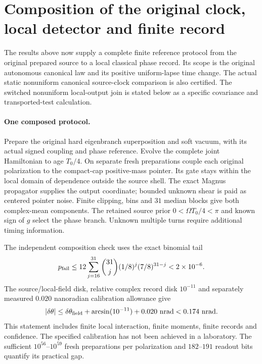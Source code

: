 \section{Composition of the original clock, local detector and finite record}
\label{sec:composition6-join}

The results above now supply a complete finite reference protocol from the
original prepared source to a local classical phase record. Its scope is
the original autonomous canonical law and its positive uniform-lapse time
change. The actual static nonuniform canonical source-clock comparison is
also certified. The switched nonuniform local-output join is stated below
as a specific covariance and transported-test calculation.

\paragraph{One composed protocol.}
Prepare the original hard eigenbranch superposition and soft vacuum, with
its actual signed coupling and phase reference. Evolve the complete joint
Hamiltonian to age $T_0/4$. On separate fresh preparations couple each
original polarization to the compact-cap positive-mass pointer. Its gate
stays within the local domain of dependence outside the source shell.
The exact Magnus propagator supplies the output coordinate; bounded
unknown shear is paid as centered pointer noise. Finite clipping, bins
and $31$ median blocks give both complex-mean components.
The retained source prior $0<\Omega T_0/4<\pi$ and known sign of $g$
select the phase branch. Unknown multiple turns require additional timing
information.

The independent composition check uses the exact binomial tail
\begin{equation}
 p_{\rm fail}\le12\sum_{j=16}^{31}
    {31\choose j}(1/8)^j(7/8)^{31-j}<2\times10^{-6}.
\end{equation}
The source/local-field disk, relative complex record disk $10^{-11}$
and separately measured $0.020$ nanoradian calibration allowance give
\begin{equation}
 |\delta\theta|\le\delta\theta_{\rm field}
       +\arcsin(10^{-11})+0.020\ {\rm nrad}
       <0.174\ {\rm nrad}.
\end{equation}
This statement includes finite local interaction, finite moments, finite
records and confidence. The specified calibration has not been achieved
in a laboratory. The sufficient $10^{56}$--$10^{59}$ fresh preparations
per polarization and $182$--$191$ readout bits quantify its practical gap.

